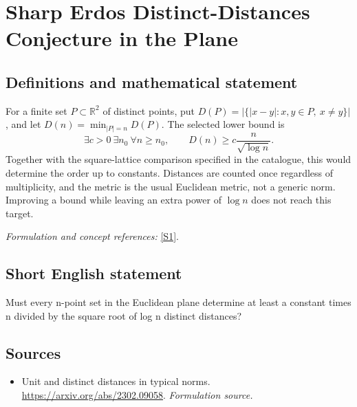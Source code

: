 \documentclass[11pt]{article}
\begin{document}
\section*{\texorpdfstring{Sharp Erdos Distinct-Distances Conjecture in the Plane}{Sharp Erdos Distinct-Distances Conjecture in the Plane}}\label{30006795}
\subsection{Definitions and mathematical statement}
For a finite set $P\subset{\mathbb{R}}^2$ of distinct points, put
$D(P)=|\{|x-y|:x,y\in P,\ x\ne y\}|$, and let
$D(n)=\min_{|P|=n}D(P)$. The selected lower bound is
\[
 \exists c>0\ \exists n_0\ \forall n\ge n_0,
 \qquad D(n)\ge c\frac{n}{\sqrt{\log n}}.
\]
Together with the square-lattice comparison specified in the catalogue, this would determine the order up to constants. Distances are counted once regardless of multiplicity, and the metric is the usual Euclidean metric, not a generic norm. Improving a bound while leaving an extra power of $\log n$ does not reach this target.
\par\smallskip\textit{Formulation and concept references:} \href{https://arxiv.org/abs/2302.09058}{[S1]}.

\subsection{Short English statement}
Must every n-point set in the Euclidean plane determine at least a constant times n divided by the square root of log n distinct distances?
\subsection{Sources}
\begin{itemize}
\item[S1]Unit and distinct distances in typical norms.
\url{https://arxiv.org/abs/2302.09058}.
\textit{Formulation source.}
\end{itemize}
\end{document}
